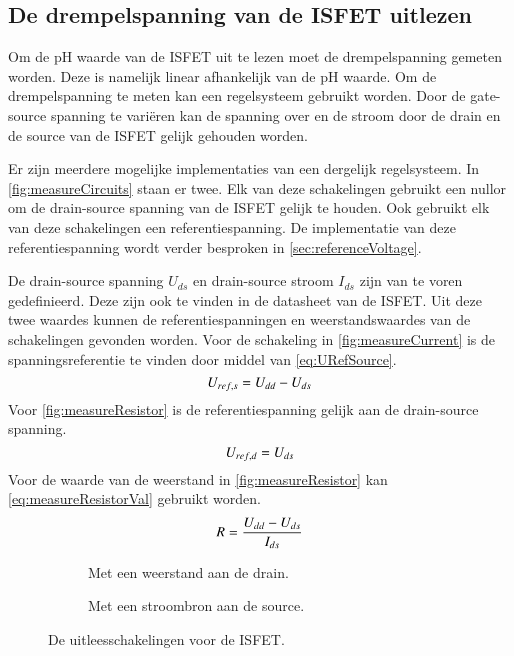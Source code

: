\subsection{De drempelspanning van de ISFET uitlezen} \label{sec:ISFETLees}

Om de pH waarde van de ISFET uit te lezen moet de drempelspanning gemeten worden. Deze is namelijk linear afhankelijk van de pH waarde.
Om de drempelspanning te meten kan een regelsysteem gebruikt worden. Door de gate-source spanning te variëren kan de spanning over en de stroom door de drain en de source van de ISFET gelijk gehouden worden.

Er zijn meerdere mogelijke implementaties van een dergelijk regelsysteem. In \autoref{fig:measureCircuits} staan er twee.
Elk van deze schakelingen gebruikt een nullor om de drain-source spanning van de ISFET gelijk te houden. Ook gebruikt elk van deze schakelingen een referentiespanning. De implementatie van deze referentiespanning wordt verder besproken in \autoref{sec:referenceVoltage}.

De drain-source spanning $U_{ds}$ en drain-source stroom $I_{ds}$ zijn van te voren gedefinieerd. Deze zijn ook te vinden in de datasheet van de ISFET\cite{isfet}. Uit deze twee waardes kunnen de referentiespanningen en weerstandswaardes van de schakelingen gevonden worden.
Voor de schakeling in \autoref{fig:measureCurrent} is de spanningsreferentie te vinden door middel van \autoref{eq:URefSource}.
\begin{equation}\label{eq:URefSource}
    U_{ref,s} = U_{dd} - U_{ds}
    \tagaddtext{[\si{\volt}]}
\end{equation}
Voor \autoref{fig:measureResistor} is de referentiespanning gelijk aan de drain-source spanning.
\begin{equation}\label{eq:URefDrain}
    U_{ref,d} = U_{ds}
    \tagaddtext{[\si{\volt}]}
\end{equation}
Voor de waarde van de weerstand in \autoref{fig:measureResistor} kan \autoref{eq:measureResistorVal} gebruikt worden.
\begin{equation}\label{eq:measureResistorVal}
    R = \frac{U_{dd} - U_{ds}}{I_{ds}}
    \tagaddtext{[\si{\ohm}]}
\end{equation}


\begin{figure}[ht]
    \centering
    \begin{subfigure}[b]{0.45\textwidth}
        \centering
        \def\svgwidth{\textwidth}
        
        \caption{Met een weerstand aan de drain.}
        \label{fig:measureResistor}
    \end{subfigure}
    \hfill
    \begin{subfigure}[b]{0.45\textwidth}
        \centering
        \def\svgwidth{\textwidth}
        
        \caption{Met een stroombron aan de source.}
        \label{fig:measureCurrent}
    \end{subfigure}
    \caption{De uitleesschakelingen voor de ISFET.}
    \label{fig:measureCircuits}
\end{figure}


